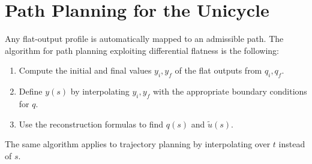 \section{Path Planning for the Unicycle}
\label{sec:path-planning-unicycle}

Any flat-output profile is automatically mapped to an admissible path.
The algorithm for path planning exploiting differential flatness is
the following:
\begin{enumerate}
    \item Compute the initial and final values \( y_i, y_f \) of the
          flat outputs from \( q_i, q_f \).
    \item Define \( y(s) \) by interpolating \( y_i, y_f \) with the
          appropriate boundary conditions for \( q \).
    \item Use the reconstruction formulas to find \( q(s) \) and
          \( \tilde{u}(s) \).
\end{enumerate}
The same algorithm applies to trajectory planning by interpolating
over \( t \) instead of \( s \).


